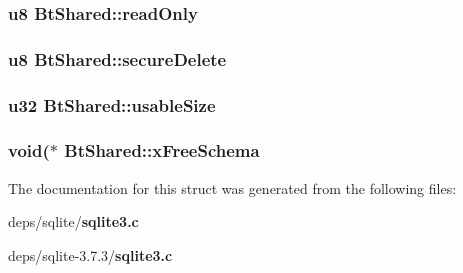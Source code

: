 \subsubsection{\setlength{\rightskip}{0pt plus 5cm}\bf{u8} \bf{Bt\-Shared::read\-Only}}\label{structBtShared_2a34c9316fd32eb423a3af5da76032d5}


\subsubsection{\setlength{\rightskip}{0pt plus 5cm}\bf{u8} \bf{Bt\-Shared::secure\-Delete}}\label{structBtShared_bed6493cba4ca6790266962b010032a3}


\subsubsection{\setlength{\rightskip}{0pt plus 5cm}\bf{u32} \bf{Bt\-Shared::usable\-Size}}\label{structBtShared_0f18e5a1578936618eaaf09eeba57146}


\subsubsection{\setlength{\rightskip}{0pt plus 5cm}void($\ast$ \bf{Bt\-Shared::x\-Free\-Schema}}\label{structBtShared_93818ddc30c6ef423a15fb01769872f9}




The documentation for this struct was generated from the following files:\begin{CompactItemize}
\item 
deps/sqlite/\bf{sqlite3.c}\item 
deps/sqlite-3.7.3/\bf{sqlite3.c}\end{CompactItemize}
